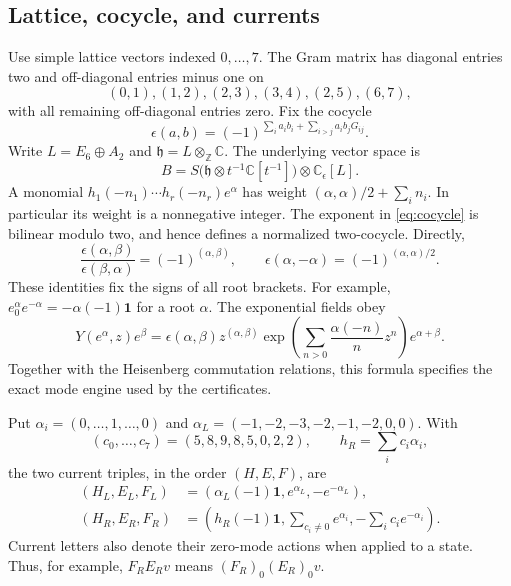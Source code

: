 \documentclass[11pt,a4paper]{article}
\theoremstyle{definition}
\newcommand{\CC}{\mathbb C}
\newcommand{\ZZ}{\mathbb Z}
\newcommand{\one}{\mathbf1}
\begin{document}
\subsection{Lattice, cocycle, and currents}
Use simple lattice vectors indexed \(0,\ldots,7\). The Gram matrix
has diagonal entries two and off-diagonal entries minus one on
\[
 (0,1),(1,2),(2,3),(3,4),(2,5),(6,7),
\]
with all remaining off-diagonal entries zero. Fix the cocycle
\begin{equation}\label{eq:cocycle}
 \epsilon(a,b)=(-1)^{\sum_i a_i b_i+
                      \sum_{i>j}a_i b_jG_{ij}}.
\end{equation}
Write $L=E_6\oplus A_2$ and $\mathfrak h=L\otimes_{\ZZ}\CC$.
The underlying vector space is
\[
 B=S\bigl(\mathfrak h\otimes t^{-1}\CC[t^{-1}]\bigr)
       \otimes\CC_\epsilon[L].
\]
A monomial $h_1(-n_1)\cdots h_r(-n_r)e^\alpha$ has weight
$(\alpha,\alpha)/2+\sum_i n_i$. In particular its weight is a
nonnegative integer. The exponent in \eqref{eq:cocycle} is bilinear
modulo two, and hence defines a normalized two-cocycle. Directly,
\[
 \frac{\epsilon(\alpha,\beta)}{\epsilon(\beta,\alpha)}
       =(-1)^{(\alpha,\beta)},\qquad
 \epsilon(\alpha,-\alpha)=(-1)^{(\alpha,\alpha)/2}.
\]
These identities fix the signs of all root brackets. For example,
$e^\alpha_0e^{-\alpha}=-\alpha(-1)\one$ for a root $\alpha$.
The exponential fields obey
\begin{equation}\label{eq:lattice-product}
 Y(e^\alpha,z)e^\beta
 =\epsilon(\alpha,\beta)z^{(\alpha,\beta)}
   \exp\!\left(\sum_{n>0}\frac{\alpha(-n)}{n}z^n\right)e^{\alpha+\beta}.
\end{equation}
Together with the Heisenberg commutation relations, this formula
specifies the exact mode engine used by the certificates.

Put $\alpha_i=(0,\ldots,1,\ldots,0)$ and
$\alpha_L=(-1,-2,-3,-2,-1,-2,0,0)$. With
\[
 (c_0,\ldots,c_7)=(5,8,9,8,5,0,2,2),\qquad
 h_R=\sum_i c_i\alpha_i,
\]
the two current triples, in the order $(H,E,F)$, are
\begin{align}
 (H_L,E_L,F_L)&=
   (\alpha_L(-1)\one,e^{\alpha_L},-e^{-\alpha_L}),\label{eq:leftcurrents}\\
 (H_R,E_R,F_R)&=
   \left(h_R(-1)\one,\sum_{c_i\ne0}e^{\alpha_i},
                    -\sum_i c_i e^{-\alpha_i}\right).
                    \label{eq:rightcurrents}
\end{align}
Current letters also denote their zero-mode actions when applied to
a state. Thus, for example, $F_RE_Rv$ means
$(F_R)_0(E_R)_0v$.
\end{document}

